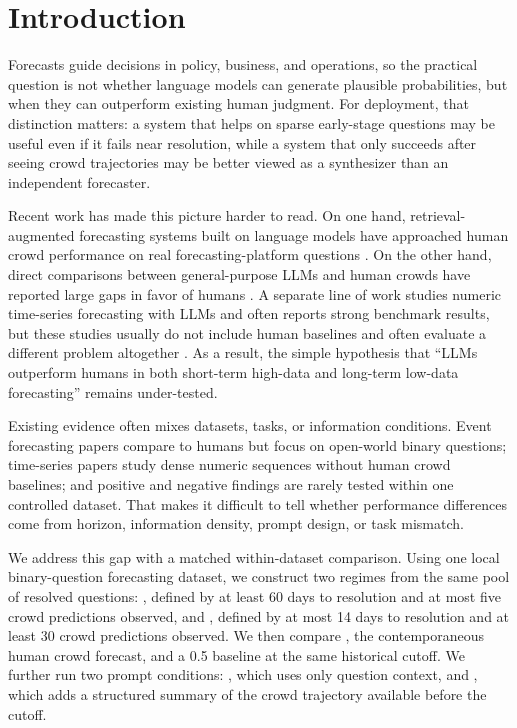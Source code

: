 \section{Introduction}
\label{sec:introduction}

Forecasts guide decisions in policy, business, and operations, so the practical question is not whether language models can generate plausible probabilities, but when they can outperform existing human judgment. For deployment, that distinction matters: a system that helps on sparse early-stage questions may be useful even if it fails near resolution, while a system that only succeeds after seeing crowd trajectories may be better viewed as a synthesizer than an independent forecaster.

Recent work has made this picture harder to read. On one hand, retrieval-augmented forecasting systems built on language models have approached human crowd performance on real forecasting-platform questions \cite{halawi2024approaching}. On the other hand, direct comparisons between general-purpose LLMs and human crowds have reported large gaps in favor of humans \cite{schoenegger2023llm}. A separate line of work studies numeric time-series forecasting with LLMs and often reports strong benchmark results, but these studies usually do not include human baselines and often evaluate a different problem altogether \cite{gruver2023llmtime,jin2024timellm,tan2024timeseries}. As a result, the simple hypothesis that ``LLMs outperform humans in both short-term high-data and long-term low-data forecasting'' remains under-tested.

 Existing evidence often mixes datasets, tasks, or information conditions. Event forecasting papers compare to humans but focus on open-world binary questions; time-series papers study dense numeric sequences without human crowd baselines; and positive and negative findings are rarely tested within one controlled dataset. That makes it difficult to tell whether performance differences come from horizon, information density, prompt design, or task mismatch.

 We address this gap with a matched within-dataset comparison. Using one local binary-question forecasting dataset, we construct two regimes from the same pool of resolved questions: \longterm, defined by at least 60 days to resolution and at most five crowd predictions observed, and \shortterm, defined by at most 14 days to resolution and at least 30 crowd predictions observed. We then compare \gptmodel, the contemporaneous human crowd forecast, and a 0.5 baseline at the same historical cutoff. We further run two prompt conditions: \questiononly, which uses only question context, and \withhistory, which adds a structured summary of the crowd trajectory available before the cutoff.

